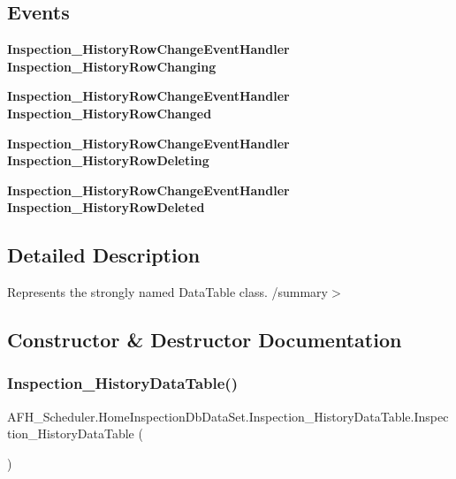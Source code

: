 \subsection*{Events}
\begin{DoxyCompactItemize}
\item 
\textbf{ Inspection\+\_\+\+History\+Row\+Change\+Event\+Handler} \textbf{ Inspection\+\_\+\+History\+Row\+Changing}
\item 
\textbf{ Inspection\+\_\+\+History\+Row\+Change\+Event\+Handler} \textbf{ Inspection\+\_\+\+History\+Row\+Changed}
\item 
\textbf{ Inspection\+\_\+\+History\+Row\+Change\+Event\+Handler} \textbf{ Inspection\+\_\+\+History\+Row\+Deleting}
\item 
\textbf{ Inspection\+\_\+\+History\+Row\+Change\+Event\+Handler} \textbf{ Inspection\+\_\+\+History\+Row\+Deleted}
\end{DoxyCompactItemize}


\subsection{Detailed Description}
Represents the strongly named Data\+Table class. /summary$>$ 

\subsection{Constructor \& Destructor Documentation}
\mbox{\label{class_a_f_h___scheduler_1_1_home_inspection_db_data_set_1_1_inspection___history_data_table_a995c06d01c13270fc68a31828391a1d9}} 
\subsubsection{Inspection\_HistoryDataTable()\hspace{0.1cm}{\footnotesize\ttfamily [1/2]}}
{\footnotesize\ttfamily A\+F\+H\+\_\+\+Scheduler.\+Home\+Inspection\+Db\+Data\+Set.\+Inspection\+\_\+\+History\+Data\+Table.\+Inspection\+\_\+\+History\+Data\+Table (\begin{DoxyParamCaption}{ }\end{DoxyParamCaption})}

